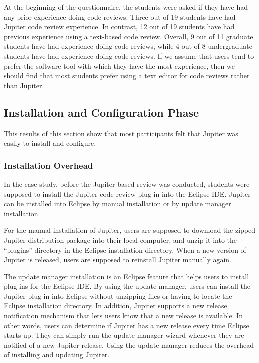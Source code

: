 At the beginning of the questionnaire, the students were asked if they have had any prior experience doing code reviews. Three out of 19 students have had Jupiter code review experience. In contrast, 12 out of 19 students have had previous experience using a text-based code review. Overall, 9 out of 11 graduate students have had experience doing code reviews, while 4 out of 8 undergraduate students have had experience doing code reviews. If we assume that users tend to prefer the software tool with which they have the most experience, then we should find that most students prefer using a text editor for code reviews rather than Jupiter.

\subsection{Installation and Configuration Phase}
\label{subsec:installation-and-configuration-phase}

This results of this section show that most participants felt that Jupiter was easily to install and configure.

\subsubsection{Installation Overhead}
\label{subsubsec:installation-overhead}

In the case study, before the Jupiter-based review was conducted, students were supposed to install the Jupiter code review plug-in into the Eclipse IDE.  Jupiter can be installed into Eclipse by manual installation or by update manager installation.

For the manual installation of Jupiter, users are supposed to download the zipped Jupiter distribution package into their local computer, and unzip it into the ``plugins'' directory in the Eclipse installation directory. When a new version of Jupiter is released, users are supposed to reinstall Jupiter manually again.

The update manager installation is an Eclipse feature that helps users to install plug-ins for the Eclipse IDE. By using the update manager, users can install the Jupiter plug-in into Eclipse without unzipping files or having to locate the Eclipse installation directory. In addition, Jupiter supports a new release notification mechanism that lets users know that a new release is available. In other words, users can determine if Jupiter has a new release every time Eclipse starts up. They can simply run the update manager wizard whenever they are notified of a new Jupiter release. Using the update manager reduces the overhead of installing and updating Jupiter.

